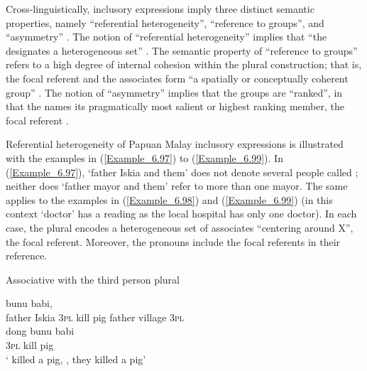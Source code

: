 Cross-linguistically,  inclusory expressions imply three distinct semantic properties, namely “referential heterogeneity”, “reference to groups”, and “asymmetry” \citep{Daniel.2013, Moravcsik.2003}. The notion of “referential heterogeneity” implies that “the  designates a heterogeneous set” \citep[1]{Daniel.2013}. The semantic property of “reference to groups” refers to a high degree of internal cohesion within the plural construction; that is, the focal referent and the associates form “a spatially or conceptually coherent group” \citep[471]{Moravcsik.2003}. The notion of “asymmetry” implies that the groups are “ranked”, in that the  names its pragmatically most salient or highest ranking member, the focal referent \citep[471]{Moravcsik.2003}.



Referential heterogeneity of Papuan Malay  inclusory expressions is illustrated with the examples in (\ref{Example_6.97}) to (\ref{Example_6.99}). In (\ref{Example_6.97}),  ‘father Iskia and them’ does not denote several people called ; neither does  ‘father mayor and them’ refer to more than one mayor. The same applies to the examples in (\ref{Example_6.98}) and (\ref{Example_6.99}) (in this context  ‘doctor’ has a  reading as the local hospital has only one doctor). In each case, the plural  encodes a heterogeneous set of associates “centering around X”, the focal referent. Moreover, the pronouns include the focal referents in their reference.


\begin{styleExampleTitle}
Associative  with the third person plural 
\end{styleExampleTitle}

\ea
\label{Example_6.97}
 {{}} {} {bunu} {babi,} {} {} {}\\ %
 {father}  {Iskia}  \textsc{3pl}  kill  pig  father  village  \textsc{3pl}\\
\gll dong  {bunu}  {babi}\\
 \textsc{3pl}  {kill}  {pig}\\
\glt
‘ killed a pig, , they killed a pig’ \textstyleExampleSource{[080917-008-NP.0120]}
\z


